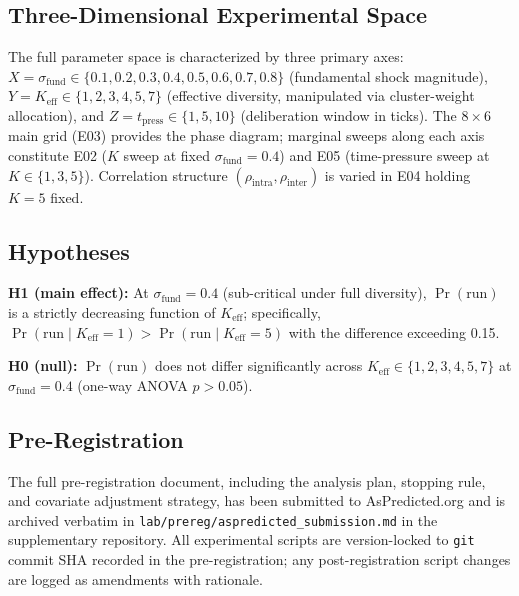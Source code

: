 \subsection{Three-Dimensional Experimental Space}

The full parameter space is characterized by three primary axes: $X = \sigma_{\text{fund}} \in \{0.1, 0.2, 0.3, 0.4, 0.5, 0.6, 0.7, 0.8\}$ (fundamental shock magnitude), $Y = K_{\text{eff}} \in \{1, 2, 3, 4, 5, 7\}$ (effective diversity, manipulated via cluster-weight allocation), and $Z = t_{\text{press}} \in \{1, 5, 10\}$ (deliberation window in ticks). The $8 \times 6$ main grid (E03) provides the phase diagram; marginal sweeps along each axis constitute E02 ($K$ sweep at fixed $\sigma_{\text{fund}} = 0.4$) and E05 (time-pressure sweep at $K \in \{1, 3, 5\}$). Correlation structure $(ρ_{\text{intra}}, ρ_{\text{inter}})$ is varied in E04 holding $K = 5$ fixed.

\subsection{Hypotheses}

\textbf{H1 (main effect):} At $\sigma_{\text{fund}} = 0.4$ (sub-critical under full diversity), $\Pr(\text{run})$ is a strictly decreasing function of $K_{\text{eff}}$; specifically, $\Pr(\text{run} \mid K_{\text{eff}}=1) > \Pr(\text{run} \mid K_{\text{eff}}=5)$ with the difference exceeding 0.15.

\textbf{H0 (null):} $\Pr(\text{run})$ does not differ significantly across $K_{\text{eff}} \in \{1, 2, 3, 4, 5, 7\}$ at $\sigma_{\text{fund}} = 0.4$ (one-way ANOVA $p > 0.05$).

\subsection{Pre-Registration}

The full pre-registration document, including the analysis plan, stopping rule, and covariate adjustment strategy, has been submitted to AsPredicted.org and is archived verbatim in \texttt{lab/prereg/aspredicted\_submission.md} in the supplementary repository. All experimental scripts are version-locked to \texttt{git} commit SHA recorded in the pre-registration; any post-registration script changes are logged as amendments with rationale.


